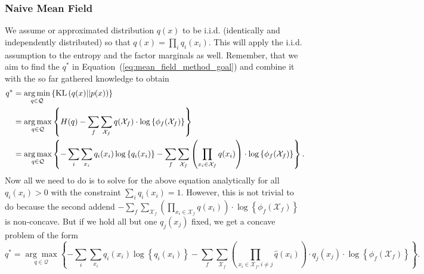 \subsubsection{Naive Mean Field}%
We assume or approximated distribution \ensuremath{q(x)} to be i.i.d. (identically and independently distributed) so that \ensuremath{{q(x) = \prod_i q_i(x_i)}}. %
This will apply the i.i.d. assumption to the entropy and the factor marginals as well. %
Remember, that we aim to find the \ensuremath{q^*} in Equation~(\ref{eq:mean_field_method_goal}) and combine it with the so far gathered knowledge to obtain %
\begin{equation*}
\begin{aligned}
q^* %
&= \underset{q\in\mathcal{Q}}{\arg\min}\left\{ \KL{q(x)}{p(x)} \right\} \\
&= \underset{q\in\mathcal{Q}}{\arg\max}\left\{  H(q) - \sum_f \sum_{\mathcal{X}_f} q(\mathcal{X}_f) \cdot \log\left\{ \phi_f(\mathcal{X}_f) \right\}  \right\} \\
&= \underset{q\in\mathcal{Q}}{\arg\max}\left\{ -\sum_i \sum_{x_i} q_i(x_i) \log\left\{ q_i(x_i) \right\}  - \sum_f \sum_{\mathcal{X}_f} \left( \prod_{x_i\in\mathcal{X}_f} q(x_i) \right) \cdot \log\left\{ \phi_f(\mathcal{X}_f) \right\}  \right\}.
\end{aligned}
\end{equation*}
Now all we need to do is to solve for the above equation analytically for all \ensuremath{q_i(x_i) > 0} with the constraint \ensuremath{\sum_i q_i(x_i) = 1}. %
However, this is not trivial to do because the second addend \ensuremath{-\sum_f \sum_{\mathcal{X}_f} \left( \prod_{x_i\in\mathcal{X}_f} q(x_i) \right) \cdot \log\left\{ \phi_f(\mathcal{X}_f) \right\}} is non-concave. %
But if we hold all but one \ensuremath{q_j(x_j)} fixed, we get a concave problem of the form %
\begin{equation*}
q^* %
= \underset{q\in\mathcal{Q}}{\arg\max}\left\{ -\sum_i \sum_{x_i} q_i(x_i) \log\left\{ q_i(x_i) \right\}  - \sum_f \sum_{\mathcal{X}_f} \left( \prod_{x_i\in\mathcal{X}_{f},i\neq j} \hat{q}(x_i) \right) \cdot q_j(x_j) \cdot \log\left\{ \phi_f(\mathcal{X}_f) \right\}  \right\}.
\end{equation*}
